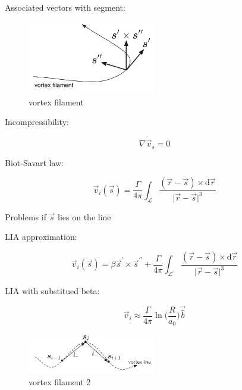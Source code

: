 Associated vectors with segment:

\begin{figure}[h]
	\centering
	\includegraphics[width=0.5\textwidth]{graphics/theory/filament}
	\caption{vortex filament}
	\label{filament}
\end{figure}

Incompressibility:

\begin{equation}
\nabla \dot \vec{v}_s = 0
\end{equation}

Biot-Savart law:

\begin{equation}
\vec{v}_i(\vec{s}) = \frac{\Gamma}{4\pi} \int_{\mathcal{L}} \frac{(\vec{r} - \vec{s}) \times \text{d}\vec{r}}{\vert \vec{r} - \vec{s} \vert^3}
\end{equation}

Problems if $\vec{s}$ lies on the line

LIA approximation:

\begin{equation}
\vec{v}_i(\vec{s}) = \beta \vec{s}^{\prime} \times \vec{s}^{\prime \prime} + \frac{\Gamma}{4\pi} \int_{\mathcal{L}^{\prime}} \frac{(\vec{r} - \vec{s}) \times \text{d}\vec{r}}{\vert \vec{r} - \vec{s} \vert^3}
\end{equation}

LIA with substitued beta:

\begin{equation}
\vec{v}_i \approx \frac{\Gamma}{4\pi} \ln\Big(\frac{R}{a_0}\Big) \vec{\hat{b}}
\end{equation}

\begin{figure}[h]
	\centering
	\includegraphics[width=0.5\textwidth]{graphics/theory/filament2}
	\caption{vortex filament 2}
	\label{filament2}
\end{figure}



